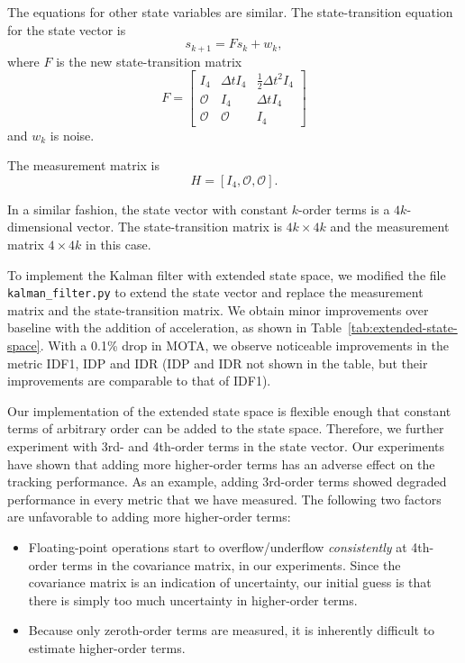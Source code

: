 \documentclass[conference]{IEEEtran}
\begin{document}
The equations for other state variables are similar. The state-transition equation for the state vector is
\[
    s_{k + 1} = Fs_k + w_k,
\]
where $F$ is the new state-transition matrix
\[
    F = \begin{bmatrix}
        I_4 & \Delta t I_4 & \frac{1}{2} \Delta t^2 I_4\\
        \mathcal{O} & I_4 & \Delta t I_4\\
        \mathcal{O} & \mathcal{O} & I_4
    \end{bmatrix}
\]
and $w_k$ is noise.

The measurement matrix is
\[
    H = [I_4, \mathcal{O}, \mathcal{O}].
\]

In a similar fashion, the state vector with constant $k$-order terms is a $4k$-dimensional vector. The state-transition matrix is $4k \times 4k$ and the measurement matrix $4 \times 4k$ in this case.

To implement the Kalman filter with extended state space, we modified the file \texttt{kalman\_filter.py} to extend the state vector and replace the measurement matrix and the state-transition matrix. We obtain minor improvements over baseline with the addition of acceleration, as shown in Table~\ref{tab:extended-state-space}. With a 0.1\% drop in MOTA, we observe noticeable improvements in the metric IDF1, IDP and IDR (IDP and IDR not shown in the table, but their improvements are comparable to that of IDF1).

Our implementation of the extended state space is flexible enough that constant terms of arbitrary order can be added to the state space. Therefore, we further experiment with 3rd- and 4th-order terms in the state vector. Our experiments have shown that adding more higher-order terms has an adverse effect on the tracking performance. As an example, adding 3rd-order terms showed degraded performance in every metric that we have measured. The following two factors are unfavorable to adding more higher-order terms:

\begin{itemize}
    \item Floating-point operations start to overflow/underflow \emph{consistently} at 4th-order terms in the covariance matrix, in our experiments. Since the covariance matrix is an indication of uncertainty, our initial guess is that there is simply too much uncertainty in higher-order terms.
    \item Because only zeroth-order terms are measured, it is inherently difficult to estimate higher-order terms.
\end{itemize}
\end{document}
